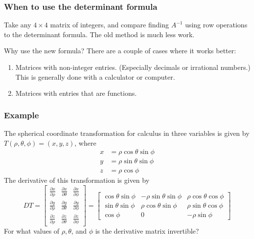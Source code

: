 \documentclass[11pt,t]{beamer}
\begin{document}
\begin{frame}
\frametitle{When to use the determinant formula}
Take any $4\times 4$ matrix of integers, and compare finding $A^{-1}$ using row operations to the determinant formula. The old method is \alert{much less work}.

Why use the new formula? There are a couple of cases where it works better:
\begin{enumerate}
\item Matrices with non-integer entries. (Especially decimals or irrational numbers.) This is generally done with a calculator or computer.
\item Matrices with entries that are \alert{functions}.
\end{enumerate}

\end{frame}
\begin{frame}
\frametitle{Example}
The \alert{spherical coordinate} transformation for calculus in three variables is given by $T(\rho, \theta, \phi) = (x,y,z)$, where
\begin{align*}
x & = \rho\cos\theta\sin\phi\\
y & = \rho\sin\theta\sin\phi\\
z & = \rho\cos\phi
\end{align*}
The \alert{derivative} of this transformation is given by
\[
DT = \begin{bmatrix}
\frac{\partial x}{\partial \rho} & \frac{\partial x}{\partial \theta} & \frac{\partial x}{\partial \phi}\\
\frac{\partial y}{\partial \rho} & \frac{\partial y}{\partial \theta} & \frac{\partial y}{\partial \phi}\\
\frac{\partial z}{\partial \rho} & \frac{\partial z}{\partial \theta} & \frac{\partial z}{\partial \phi}
\end{bmatrix} = 
\begin{bmatrix}
\cos\theta\sin\phi & -\rho\sin\theta\sin\phi & \rho\cos\theta\cos\phi\\
\sin\theta\sin\phi & \rho\cos\theta\sin\phi & \rho\sin\theta\cos\phi\\
\cos\phi & 0 &-\rho\sin\phi 
\end{bmatrix}
\]
For what values of $\rho, \theta$, and $\phi$ is the derivative matrix invertible?
\end{frame}
\end{document}

